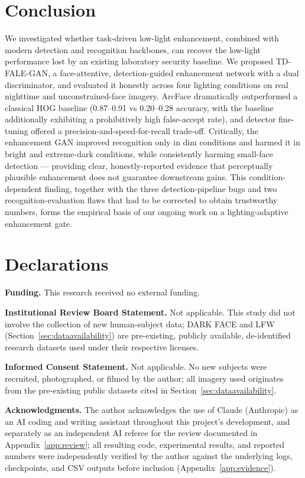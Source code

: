 \documentclass[conference]{IEEEtran}
\begin{document}
\section{Conclusion}
We investigated whether task-driven low-light enhancement,
combined with modern detection and recognition backbones, can
recover the low-light performance lost by an existing laboratory
security baseline. We proposed TD-FALE-GAN, a face-attentive,
detection-guided enhancement network with a dual discriminator,
and evaluated it honestly across four lighting conditions on real
nighttime and unconstrained-face imagery. ArcFace dramatically
outperformed a classical HOG baseline (0.87--0.91 vs 0.20--0.28
accuracy, with the baseline additionally exhibiting a
prohibitively high false-accept rate), and detector fine-tuning
offered a precision-and-speed-for-recall trade-off. Critically,
the enhancement GAN improved recognition only in dim conditions
and harmed it in bright and extreme-dark conditions, while
consistently harming small-face detection --- providing clear,
honestly-reported evidence that perceptually plausible enhancement
does not guarantee downstream gains. This condition-dependent
finding, together with the three detection-pipeline bugs and two
recognition-evaluation flaws that had to be corrected to obtain
trustworthy numbers, forms the empirical basis of our ongoing
work on a lighting-adaptive enhancement gate.

\section{Declarations}
\label{sec:declarations}
\textbf{Funding.} This research received no external funding.

\textbf{Institutional Review Board Statement.} Not applicable.
This study did not involve the collection of new human-subject
data; DARK FACE and LFW (Section~\ref{sec:dataavailability}) are
pre-existing, publicly available, de-identified research datasets
used under their respective licenses.

\textbf{Informed Consent Statement.} Not applicable. No new
subjects were recruited, photographed, or filmed by the author;
all imagery used originates from the pre-existing public datasets
cited in Section~\ref{sec:dataavailability}.

\textbf{Acknowledgments.} The author acknowledges the use of
Claude (Anthropic) as an AI coding and writing assistant
throughout this project's development, and separately as an
independent AI referee for the review documented in
Appendix~\ref{app:review}; all resulting code, experimental
results, and reported numbers were independently verified by the
author against the underlying logs, checkpoints, and CSV outputs
before inclusion (Appendix~\ref{app:evidence}).
\end{document}
